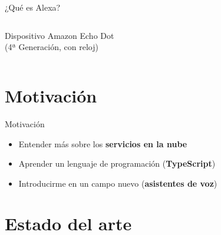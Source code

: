 \documentclass{beamer}
\begin{document}
\begin{frame}{¿Qué es Alexa?}
\begin{columns}[c]
\begin{column}{.49\textwidth}
        \centering \vspace{0.5em}
        
        \footnotesize
        Dispositivo Amazon Echo Dot\\
        (4ª Generación, con reloj)
      \end{column}
    \end{columns}
  \end{frame}

  \section{Motivación}
  
  \newcommand{\includecenteredgraphicsb}[3][.35]{\raisebox{-#1\height}{\texttt{[image: \#3]}}}
  \newcommand{\includecenteredgraphicsl}[3][.35]{\includecenteredgraphicsb[#1]{#2}{#3}\hspace{.1em}}
  \newcommand{\includecenteredgraphicsr}[3][.35]{\hspace{.1em}\includecenteredgraphicsb[#1]{#2}{#3}}
 
  \begin{frame}{Motivación}
    \begin{itemize}
      \setlength\itemsep{1.5em}
      \item Entender más sobre los \textbf{servicios en la nube}
      \includecenteredgraphicsr{.35}{aws-lambda-logo.png}
      \item Aprender un lenguaje de programación (\textbf{TypeScript})
      \includecenteredgraphicsr{.02}{typescript-logo.png}
      \item Introducirme en un campo nuevo (\textbf{asistentes de voz})
      \includecenteredgraphicsr{1}{amazon-alexa.png}
    \end{itemize}
  \end{frame}

  \section{Estado del arte}
\end{document}
